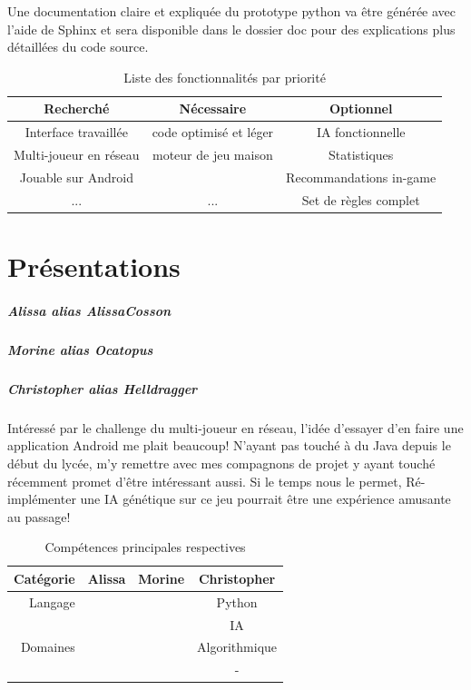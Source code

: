 \documentclass{scrreprt}
\begin{document}
	Une documentation claire et expliquée du prototype python va être générée avec l'aide de Sphinx et sera disponible dans le dossier doc pour des explications plus détaillées du code source.
	
	\begin{table}[b]
		\caption{Liste des fonctionnalités par priorité}
		\centering
		\begin{tabular}{| c | c | c |}
			\hline
			Recherché & Nécessaire & Optionnel\\
			\hline
			Interface travaillée & code optimisé et léger & IA fonctionnelle \\
			Multi-joueur en réseau & moteur de jeu maison & Statistiques \\
			Jouable sur Android &  & Recommandations in-game \\
			... & ... & Set de règles complet\\
			\hline
			
		\end{tabular}
	
	\end{table}
\clearpage
\chapter{Présentations}

	\paragraph{Alissa alias AlissaCosson}
	
	\paragraph{Morine alias Ocatopus}
	
	\paragraph{Christopher alias Helldragger}
	Intéressé par le challenge du multi-joueur en réseau, l'idée d'essayer d'en faire une application Android me plait beaucoup!
	N'ayant pas touché à du Java depuis le début du lycée, m'y remettre avec mes compagnons de projet y ayant touché récemment promet d'être intéressant aussi.
	Si le temps nous le permet, Ré-implémenter une IA génétique sur ce jeu pourrait être une expérience amusante au passage!
		
	\begin{table}[b]
		\caption{Compétences principales respectives}
		\centering
		\begin{tabular}{r | c | c | c |}
			\hline
			Catégorie & Alissa & Morine & Christopher\\
			\hline
			Langage &  &  & Python \\
			\hline
			 &  &  & IA \\
			Domaines &  &  & Algorithmique \\
			 &  &  & - \\
			\hline
			
		\end{tabular}
		
	\end{table}
\end{document}
